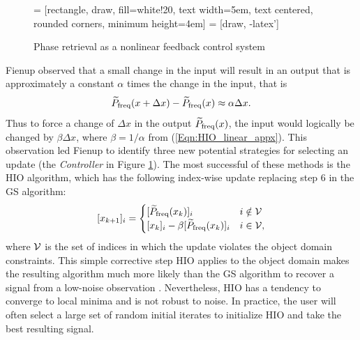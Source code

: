 \begin{enumerate}
\begin{figure}[H]
\centering

 = [rectangle, draw, fill=white!20,
    text width=5em, text centered, rounded corners, minimum height=4em]
 = [draw, -latex']


\caption{Phase retrieval as a nonlinear feedback control system} \label{Fig:nonlinear_feedback_control_system}
\end{figure}


Fienup observed that a small change in the input will result in an output that is approximately a constant $\alpha$ times the change in the input, that is
\begin{equation} 		\label{Eqn:HIO_linear_appx}
	\widetilde{P}_\textnormal{freq}(x + \Delta x) - \widetilde{P}_\textnormal{freq}(x) \approx \alpha \Delta x.
\end{equation}
Thus to force a change of $\Delta x$ in the output $\widetilde{P}_\textnormal{freq}(x)$, the input would logically be changed by $\beta \Delta x$, where $\beta = 1/\alpha$ from (\ref{Eqn:HIO_linear_appx}).  This observation led Fienup to identify three new potential strategies for selecting an update (the \textit{Controller} in Figure \ref{Fig:nonlinear_feedback_control_system}).  The most successful of these methods is the HIO algorithm, which has the following index-wise update replacing step 6 in the GS algorithm:
\begin{equation} 		\label{Eqn:HIO_step_6}
[x_{k+1}]_i =
	\begin{cases}
		[\widetilde{P}_\textnormal{freq}(x_k)]_i	&	i \notin {\mathcal V}		\\
		[x_k]_i - \beta [\widetilde{P}_\textnormal{freq}(x_k)]_i			&	 i \in {\mathcal V},
	\end{cases}
\end{equation}
where ${\mathcal V}$ is the set of indices in which the update violates the object domain constraints.  This simple corrective step HIO applies to the object domain makes the resulting algorithm much more likely than the GS algorithm to recover a signal from a low-noise observation \cite{DBLP:journals/corr/JaganathanEH15a}.   Nevertheless, HIO has a tendency to converge to local minima and is not robust to noise.  In practice, the user will often select a large set of random initial iterates to initialize HIO and take the best resulting signal.



\end{enumerate}
